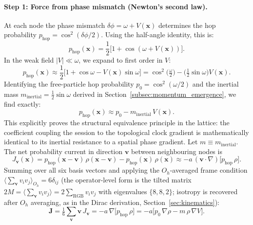 \paragraph{Step 1: Force from phase mismatch (Newton's second law).}
At each node the phase mismatch $\delta\phi = \omega + V(\mathbf{x})$
determines the hop probability $p_\mathrm{hop} = \cos^2(\delta\phi/2)$.
Using the half-angle identity, this is:
\begin{equation}
    p_\mathrm{hop}(\mathbf{x}) = \frac{1}{2}\bigl[1 + \cos(\omega + V(\mathbf{x}))\bigr].
\end{equation}
In the weak field $|V| \ll \omega$, we expand to first order in $V$:
\begin{equation}
    p_\mathrm{hop}(\mathbf{x}) \approx \frac{1}{2}\bigl[1 + \cos\omega - V(\mathbf{x})\sin\omega\bigr]
        = \cos^2\!\bigl(\tfrac{\omega}{2}\bigr) - \bigl(\tfrac{1}{2}\sin\omega\bigr)V(\mathbf{x}).
\end{equation}
Identifying the free-particle hop probability $p_0 = \cos^2(\omega/2)$ and the inertial mass
$m_\text{inertial} = \tfrac{1}{2}\sin\omega$ derived in Section~\ref{subsec:momentum_emergence}, we find exactly:
\begin{equation}
    p_\mathrm{hop}(\mathbf{x})
        \approx p_0 - m_\text{inertial}\,V(\mathbf{x}).
    \label{eq:phop_expand}
\end{equation}
This explicitly proves the structural equivalence principle in the lattice: the coefficient coupling the session
to the topological clock gradient is mathematically identical to its inertial resistance to a spatial phase gradient. Let $m \equiv m_\text{inertial}$.
The net probability current in direction $\mathbf{v}$ between
neighbouring nodes is
\begin{equation}
    J_\mathbf{v}(\mathbf{x})
        = p_\mathrm{hop}(\mathbf{x}{-}\mathbf{v})\,\rho(\mathbf{x}{-}\mathbf{v})
        - p_\mathrm{hop}(\mathbf{x})\,\rho(\mathbf{x})
        \approx -a\,(\mathbf{v}\cdot\nabla)\bigl[p_\mathrm{hop}\,\rho\bigr].
    \label{eq:flux}
\end{equation}
Summing over all six basis vectors and applying the $O_h$-averaged
frame condition
$\langle\sum_{\mathbf{v}} v_i v_j\rangle_{O_h} = 6\delta_{ij}$
(the operator-level form is the tilted matrix
$2M = \langle\sum_\mathbf{v} v_i v_j\rangle = 2\sum_\text{RGB} v_i v_j$
with eigenvalues $\{8,8,2\}$; isotropy is recovered after $O_h$
averaging, as in the Dirac derivation,
Section~\ref{sec:kinematics}):
\begin{equation}
    \mathbf{J} = \tfrac{1}{6}\sum_\mathbf{v} \mathbf{v}\,J_\mathbf{v}
               = -a\,\nabla\!\bigl[p_\mathrm{hop}\,\rho\bigr]
               = -a\bigl[p_0\,\nabla\rho - m\,\rho\,\nabla V\bigr].
    \label{eq:Jfull}
\end{equation}
